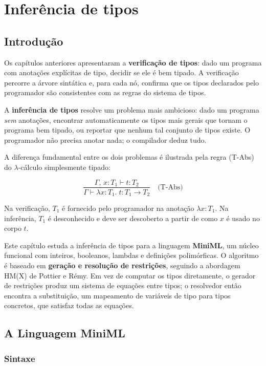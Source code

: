 \chapter{Inferência de tipos}

\section{Introdução}

Os capítulos anteriores apresentaram a \textbf{verificação de tipos}:
dado um programa com anotações explícitas de tipo, decidir se ele é
bem tipado. A verificação percorre a árvore sintática e, para cada
nó, confirma que os tipos declarados pelo programador são
consistentes com as regras do sistema de tipos.

A \textbf{inferência de tipos} resolve um problema mais ambicioso:
dado um programa \emph{sem} anotações, encontrar automaticamente os
tipos mais gerais que tornam o programa bem tipado, ou reportar
que nenhum tal conjunto de tipos existe. O programador não precisa
anotar nada; o compilador deduz tudo.

A diferença fundamental entre os dois problemas é ilustrada pela
regra (T-Abs) do $\lambda$-cálculo simplesmente tipado:

\[ \frac{\Gamma,\, x : T_1 \vdash t : T_2} {\Gamma \vdash \lambda x {:} T_1.\;
t : T_1 \to T_2} \quad\text{(T-Abs)} \]

Na verificação, \(T_1\) é fornecido pelo programador na anotação
\(\lambda x : T_1 \). Na inferência,
\(T_1\) é desconhecido e deve ser descoberto a partir de como \(x\) é
usado no corpo \(t\).

Este capítulo estuda a inferência de tipos para a linguagem
\textbf{MiniML}, um núcleo funcional com inteiros, booleanos,
lambdas e definições polimórficas. O algoritmo é baseado em
\textbf{geração e resolução de restrições}, seguindo a abordagem
HM(X) de Pottier e Rémy. Em vez de computar os tipos diretamente, o
gerador de restrições produz um sistema de equações entre tipos; o
resolvedor então encontra a substituição, um mapeamento de
variáveis de tipo para tipos concretos, que satisfaz todas as equações.

\section{A Linguagem MiniML}

\subsection{Sintaxe}


